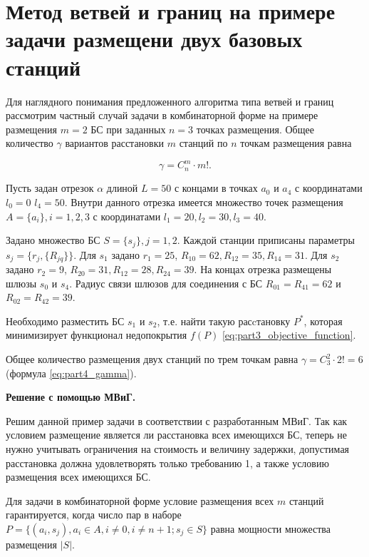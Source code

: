 
\FloatBarrier
\section{Метод ветвей и границ на примере задачи размещени двух базовых станций}\label{part4:bnb_algorithm}

Для наглядного понимания предложенного алгоритма типа ветвей и границ рассмотрим частный случай задачи в комбинаторной форме на примере размещения $m = 2$ БС при заданных $n = 3$ точках размещения.  Общее количество $\gamma$ вариантов расстановки $m$ станций по $n$ точкам размещения равна 

\begin{equation}
  \label{eq:part4_gamma}
  \gamma = C^m_n \cdot m! .
\end{equation}



Пусть задан отрезок $\alpha$ длиной $L = 50$ с концами в точках $a_0$ и $a_4$ с координатами $l_0 = 0$ $l_4 = 50$. Внутри данного отрезка имеется множество точек размещения $A = \{a_i\}, i = 1, 2, 3$ с координатами $l_1 = 20, l_2 = 30, l_3 = 40$. 

Задано множество БС $S = \{ s_j \} , j = 1, 2$. Каждой станции приписаны параметры $s_j = \{ r_j, \{R_{jq}\}\}$.  Для $s_1$ задано $r_1 = 25$, $R_{10} = 62, R_{12} = 35, R_{14} = 31$. Для $s_2$ задано $r_2 = 9$, $R_{20} = 31, R_{12} = 28, R_{24} = 39$.
На концах отрезка размещены шлюзы $s_0$ и $s_4$. Радиус связи шлюзов для соединения с БС $R_{01} = R_{41} = 62$ и $R_{02} = R_{42} = 39$. 


Необходимо разместить БС $s_1$ и $s_2$, т.е. найти такую расcтановку $P^*$, которая минимизирует функционал недопокрытия $f(P)$ \cref{eq:part3_objective_function}.

Общее количество размещения двух станций по трем точкам равна $\gamma = C^2_3 \cdot 2! = 6$ (формула \cref{eq:part4_gamma}).

\textbf{Решение с помощью МВиГ.}

Решим данной пример задачи в соответствии с разработанным МВиГ. Так как  условием размещение является ли расстановка всех имеющихся БС, теперь не нужно учитывать ограничения на стоимость и величину задержки, допустимая расстановка должна удовлетворять только требованию 1, а также условию размещения всех имеющихся БС.

Для задачи в комбинаторной форме условие размещения всех $m$ станций гарантируется, когда число пар в наборе $P = \{ (a_i, s_j), a_i \in A, i \neq 0, i \neq n + 1; s_j \in S\}$ равна мощности множества размещения $|S|$. 

